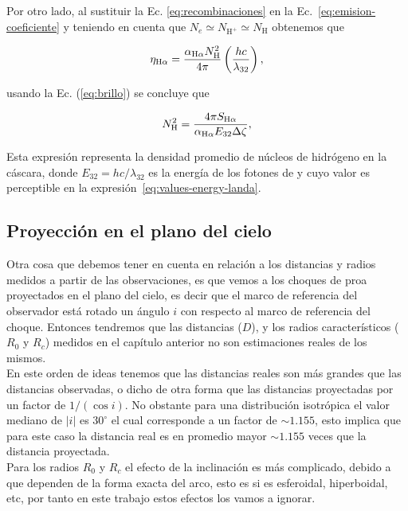 Por otro lado, al sustituir la Ec. \ref{eq:recombinaciones} en la Ec.~\ref{eq:emision-coeficiente} y teniendo en cuenta que \(N_{e}\simeq N_{\text{H}^{+}} \simeq N_{\text{H}}\) obtenemos que

\begin{equation}
 \eta_{\mathrm{H}\alpha} =  \frac{\alpha_{\mathrm{H}\alpha}N_{\text{H}}^{2}}{4\pi} \left(\frac{hc}{\lambda_{32}}\right),  
\end{equation}

 usando la Ec. (\ref{eq:brillo}) se concluye que

\begin{equation}
  \label{eq:densidad}
  N_{\text{H}}^{2}=\frac{4 \pi S_{\mathrm{H}\alpha}}{\alpha_{\mathrm{H}\alpha} E_{32} \Delta \zeta},
\end{equation}

\noindent Esta expresión representa la densidad promedio de núcleos de hidrógeno en la cáscara, donde \( E_{32} = hc/\lambda_{32}\) es la energía de los fotones de \ha{} y cuyo valor es perceptible en la expresión~\ref{eq:values-energy-landa}. 

\subsection{Proyección en el plano del cielo}
\label{sec:pro}

Otra cosa que debemos tener en cuenta en relación a los distancias y radios medidos a partir de las observaciones, es que vemos a los choques de proa proyectados en el plano del cielo, es decir que el marco de referencia del observador está rotado un ángulo \(i\) con respecto al marco de referencia del choque. Entonces tendremos que las distancias (\(D\)), y los radios característicos (\(R_{0}\) y \(R_{c}\)) medidos en el capítulo anterior no son estimaciones reales de los mismos.\\ 

En este orden de ideas tenemos que las distancias reales son más grandes que las distancias observadas, o dicho de otra forma que las distancias proyectadas por un factor de \(1/(\cos i)\). No obstante para una distribución isotrópica el valor mediano de \(|i|\) es \(30^{\circ}\) el cual corresponde a un factor de \(\sim1.155\), esto implica que para este caso la distancia real es en promedio mayor \(\sim1.155\) veces que la distancia proyectada.\\ 

Para los radios \(R_{0}\) y \(R_{c}\) el efecto de la inclinación es más complicado, debido a que dependen de la forma exacta del arco, esto es si es esferoidal, hiperboidal, etc, por tanto en este trabajo estos efectos los vamos a ignorar.


